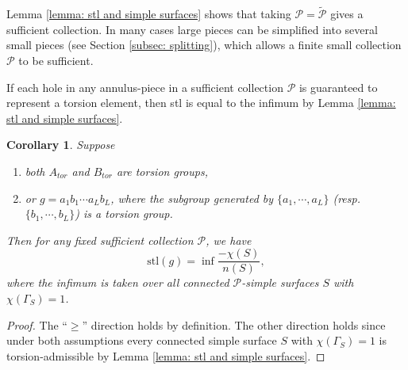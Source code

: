 \documentclass{amsart}
\newtheorem{corollary}[theorem]{Corollary}
\theoremstyle{definition}
\numberwithin{equation}{section}
\theoremstyle{theorem}
\theoremstyle{remark}
\def\stl{\mathrm{stl}}
\def\tcP{\widetilde{\mathcal{P}}}
\begin{document}
	Lemma \ref{lemma: stl and simple surfaces} shows that taking $\mathcal{P}=\tcP$ gives a sufficient collection.
	In many cases large pieces can be simplified into several small pieces (see Section \ref{subsec: splitting}), which allows a finite small collection $\mathcal{P}$ to be sufficient.
	
	If each hole in any annulus-piece in a sufficient collection $\mathcal{P}$ is guaranteed to represent a torsion element, 
	then stl is equal to the infimum by Lemma \ref{lemma: stl and simple surfaces}.
	\begin{corollary}\label{cor: simple surface is enough}
		Suppose
		\begin{enumerate}
		    \item both $A_{tor}$ and $B_{tor}$ are torsion groups,
		    \item or $g=a_1b_1\cdots a_Lb_L$, where the subgroup generated by $\{a_1,\cdots, a_L\}$ (resp. $\{b_1,\cdots,b_L\}$) is a torsion group.
		\end{enumerate}
		Then for any fixed sufficient collection $\mathcal{P}$, we have
		$$
		\stl(g)=\inf \frac{-\chi(S)}{n(S)},
		$$
		where the infimum is taken over all connected $\mathcal{P}$-simple surfaces $S$ with $\chi(\Gamma_S)=1$.
	\end{corollary}
	\begin{proof}
		The ``$\ge$'' direction holds by definition. The other direction holds since under both assumptions every connected simple surface $S$ 
		with $\chi(\Gamma_S)=1$ is torsion-admissible by Lemma \ref{lemma: stl and simple surfaces}.
	\end{proof}
	
\end{document}
